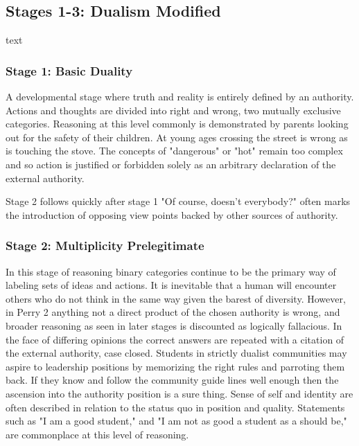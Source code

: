 \subsection{Stages 1-3: Dualism Modified}

text

\subsubsection{Stage 1: Basic Duality}

A developmental stage where truth and reality is entirely defined by an authority.  Actions and thoughts are divided into right and wrong, two mutually exclusive categories.  Reasoning at this level commonly is demonstrated by parents looking out for the safety of their children.  At young ages crossing the street is wrong as is touching the stove.  The concepts of "dangerous" or "hot" remain too complex and so action is justified or forbidden solely as an arbitrary declaration of the external authority.  

Stage 2 follows quickly after stage 1
"Of course, doesn't everybody?" often marks the introduction of opposing view points backed by other sources of authority. 

\subsubsection{Stage 2: Multiplicity Prelegitimate}

In this stage of reasoning binary categories continue to be the primary way of labeling sets of ideas and actions.  It is inevitable that a human will encounter others who do not think in the same way given the barest of diversity.  However, in Perry 2 anything not a direct product of the chosen authority is wrong, and broader reasoning as seen in later stages is discounted as logically fallacious.  In the face of differing opinions the correct answers are repeated with a citation of the external authority, case closed.  Students in strictly dualist communities may aspire to leadership positions by memorizing the right rules and parroting them back.  If they know and follow the community guide lines well enough then the ascension into the authority position is a sure thing.  Sense of self and identity are often described in relation to the status quo in position and quality. Statements such as "I am a good student," and "I am not as good a student as a should be," are commonplace at this level of reasoning.

